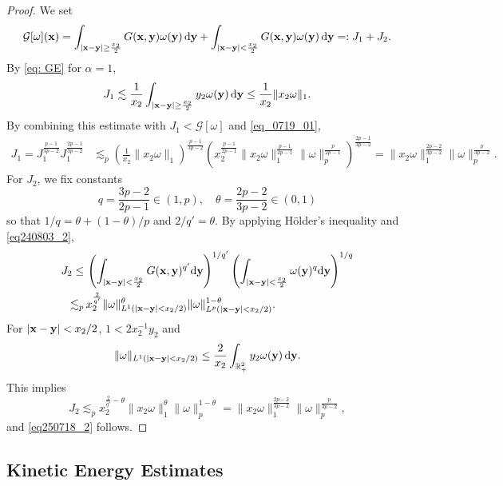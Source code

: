 \documentclass[11pt]{amsart}
\theoremstyle{definition}
\theoremstyle{definition}
\numberwithin{equation}{section}
\newcommand{\0}{\emptyset}
\newcommand{\bfx}{{\bf x}}
\newcommand{\bfy}{{\bf y}}
\newcommand{\bbR}{\mathbb R}
\newcommand{\calG}{\mathcal G}
\newcommand{\dd}{\mathrm{d}}
\begin{document}
\begin{proof}
		We set  
		\[
		\calG[\omega](\bfx)=\int_{|\bfx-\bfy|\ge \frac{x_2}{2}}G(\bfx,\bfy)\omega(\bfy)\,\dd\bfy
		+\int_{|\bfx-\bfy|<\frac{x_2}{2}}G(\bfx,\bfy)\omega(\bfy)\,\dd\bfy=:J_1+J_2.
		\]
		By \eqref{eq: GE} for $\alpha=1$,
		\[
		J_1 \lesssim \frac{1}{x_2}\int_{|\bfx - \bfy| \ge \frac{x_2}{2}}  y_2\omega(\bfy)\,\dd\bfy
		\le \frac{1}{x_2}\|x_2\omega\|_{1}.
		\]
		By combining this estimate with $J_1<\mathcal{G}[\omega]$ and \eqref{eq_0719_01}, 
		\begin{align*}
			J_1 = J_1^{\frac{p-1}{3p-2}} J_1^{\frac{2p-1}{3p-2}} 
			&\lesssim_p  \left( \frac{1}{x_2}\|x_2\omega\|_{1} \right)^{\frac{p-1}{3p-2}} \left( x_2^{\frac{p-1}{2p-1}} \|x_2 \omega\|_1^{\frac{p-1}{2p-1}} \|\omega\|_p^{\frac{p}{2p-1}}\right)^{\frac{2p-1}{3p-2}} =  \|x_2 \omega\|_1^{\frac{2p-2}{3p-2}} \|\omega\|_p^{\frac{p}{3p-2}}.
		\end{align*}
		For $J_2$, we fix constants
		\[
		q = \frac{3p-2}{2p-1} \in (1, p), \quad \theta = \frac{2p-2}{3p-2} \in (0, 1)
		\]
		so that $1/q = \theta + (1-\theta)/p$ and $2/q' = \theta$. By applying H\"older's inequality and \eqref{eq240803_2},
		\begin{align*}
			J_2 \le & \, \left( \int_{|\bfx - \bfy| < \frac{x_2}{2}} G(\bfx, \bfy)^{q'}  \dd \bfy \right)^{1/q'}\left( \int_{|\bfx - \bfy| < \frac{x_2}{2}} \omega( \bfy)^{q}  \dd \bfy \right)^{1/q} \\
			\lesssim_{p} & \,x_2^{\frac{2}{q'}} \|\omega\|_{L^1(|\bfx - \bfy| < x_2/2)}^{\theta} \| \omega\|_{L^p(|\bfx - \bfy| < x_2/2)}^{1-\theta}.
		\end{align*}
		For $|\bfx - \bfy|< x_2/2$, $1< 2x_2^{-1}y_2$ and 
		\[
		\|\omega\|_{L^1(|\bfx - \bfy| < x_2/2)} \le \frac{2}{x_2} \int_{\bbR^2_+} y_2\omega(\bfy)\,\dd \bfy.
		\]
		This implies 
		\[
		J_2 \lesssim_p x_2^{\frac{2}{q'} - \theta} \| x_2 \omega\|_1^{\theta} \| \omega \|_p^{1-\theta} = \|x_2 \omega\|_1^{\frac{2p-2}{3p-2}} \|\omega\|_p^{\frac{p}{3p-2}},
		\]
		and \eqref{eq250718_2} follows.
	\end{proof}
	
	
	\subsection{Kinetic Energy Estimates}
	
\end{document}
